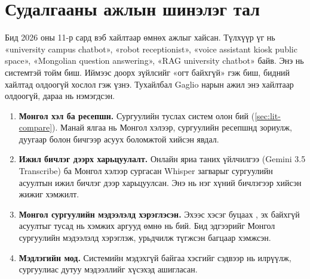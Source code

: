 \section{Судалгааны ажлын шинэлэг тал}
\label{sec:lit-novelty}

Бид 2026 оны 11-р сард вэб хайлтаар өмнөх ажлыг хайсан. Түлхүүр үг нь «university campus chatbot», «robot receptionist», «voice assistant kiosk public space», «Mongolian question answering», «RAG university chatbot» байв. Энэ нь системтэй тойм биш. Иймээс доорх зүйлсийг «огт байхгүй» гэж биш, бидний хайлтад олдоогүй хослол гэж үзнэ. Тухайлбал Gaglio нарын ажил энэ хайлтаар олдоогүй, дараа нь нэмэгдсэн.

\begin{enumerate}
    \item \textbf{Монгол хэл ба ресепшн.} Сургуулийн туслах систем олон бий (\ref{sec:lit-compare}). Манай ялгаа нь Монгол хэлээр, сургуулийн ресепшнд зориулж, дуугаар болон бичгээр асуух боломжтой хийсэн явдал.
    \item \textbf{Ижил бичлэг дээрх харьцуулалт.} Онлайн яриа таних үйлчилгээ (Gemini 3.5 Transcribe) ба Монгол хэлээр сургасан Whisper загварыг сургуулийн асуултын ижил бичлэг дээр харьцуулсан. Энэ нь нэг хүний бичлэгээр хийсэн жижиг хэмжилт.
    \item \textbf{Монгол сургуулийн мэдээлэлд хэрэглэсэн.} Эхээс хэсэг буцаах \cite{gaglio2019campus}, эх байхгүй асуултыг тусад нь хэмжих \cite{rajpurkar2018squad2,trienes2025marcel} аргууд өмнө нь бий. Бид эдгээрийг Монгол сургуулийн мэдээлэлд хэрэглэж, урьдчилж түгжсэн багцаар хэмжсэн.
    \item \textbf{Мэдлэгийн мод.} Системийн мэдэхгүй байгаа хэсгийг сэдвээр нь илрүүлж, сургуулиас дутуу мэдээллийг хүсэхэд ашигласан.
\end{enumerate}

